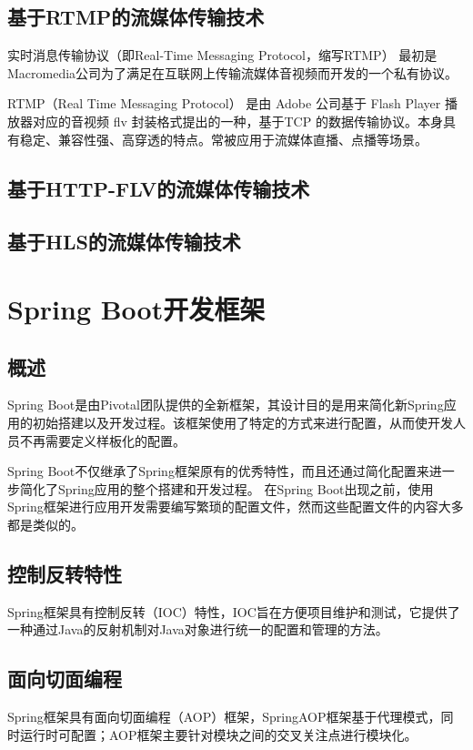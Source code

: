 
\subsection{基于RTMP的流媒体传输技术}
实时消息传输协议（即Real-Time Messaging Protocol，缩写RTMP） 最初是Macromedia公司为了满足在互联网上传输流媒体音视频而开发的一个私有协议。

RTMP（Real Time Messaging Protocol） 是由 Adobe 公司基于 Flash Player 播放器对应的音视频 flv 封装格式提出的一种，基于TCP 的数据传输协议。本身具有稳定、兼容性强、高穿透的特点。常被应用于流媒体直播、点播等场景。


\subsection{基于HTTP-FLV的流媒体传输技术}
\subsection{基于HLS的流媒体传输技术}

\section{Spring Boot开发框架}

\subsection{概述}
Spring Boot是由Pivotal团队提供的全新框架，其设计目的是用来简化新Spring应用的初始搭建以及开发过程。该框架使用了特定的方式来进行配置，从而使开发人员不再需要定义样板化的配置。

Spring Boot不仅继承了Spring框架原有的优秀特性，而且还通过简化配置来进一步简化了Spring应用的整个搭建和开发过程。
在Spring Boot出现之前，使用Spring框架进行应用开发需要编写繁琐的配置文件，然而这些配置文件的内容大多都是类似的。

\subsection{控制反转特性}
Spring框架具有控制反转（IOC）特性，IOC旨在方便项目维护和测试，它提供了一种通过Java的反射机制对Java对象进行统一的配置和管理的方法。

\subsection{面向切面编程}
Spring框架具有面向切面编程（AOP）框架，SpringAOP框架基于代理模式，同时运行时可配置；AOP框架主要针对模块之间的交叉关注点进行模块化。


